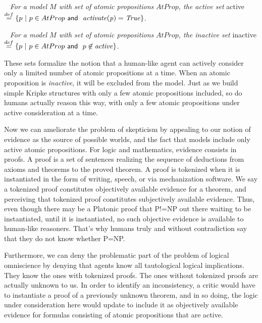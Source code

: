 \begin{definition}~\label{active_set}
	\emph{For a model $M$ with set of atomic propositions} $AtProp$\emph{, the active set} active  $\stackrel{def}{=} \{p\  |\  p \in AtProp \textsf{\ and \ } \mathit{activate(p)} = \mathit{True}\}$.
\end{definition}

\begin{definition}~\label{inactive_set}
	\emph{For a model $M$ with set of atomic propositions} $AtProp$\emph{, the inactive set} inactive  $\stackrel{def}{=} \{p\  |\  p \in AtProp \textsf{\ and \ } p\not\in \mathit{active}\}$.
\end{definition}

These sets formalize the notion that a human-like agent can actively consider only a limited number of atomic propositions at a time. When an atomic proposition is \emph{inactive}, it will be excluded from the model. Just as we build simple Kripke structures with only a few atomic propositions included, so do humans actually reason this way, with only a few atomic propositions under active consideration at a time. 

Now we can ameliorate the problem of skepticism by appealing to our notion of evidence as the source of possible worlds, and the fact that models include only active atomic propositions. For logic and mathematics, evidence consists in proofs. A proof is a set of sentences realizing the sequence of deductions from axioms and theorems to the proved theorem. A proof is tokenized when it is instantiated in the form of writing, speech, or via mechanization software. We say a tokenized proof constitutes objectively available evidence for a theorem, and perceiving that tokenized proof constitutes subjectively available evidence. Thus, even though there may be a Platonic proof that P!=NP out there waiting to be instantiated, until it is instantiated, no such objective evidence is available to human-like reasoners. That's why humans truly and without contradiction say that they do not know whether P=NP.

Furthermore, we can deny the problematic part of the problem of logical omniscience by denying that agents know all tautological logical implications. They know the ones with tokenized proofs. The ones without tokenized proofs are actually unknown to us. In order to identify an inconsistency, a critic would have to instantiate a proof of a previously unknown theorem, and in so doing, the logic under consideration here would update to include it as objectively available evidence for formulas consisting of atomic propositions that are active. 

